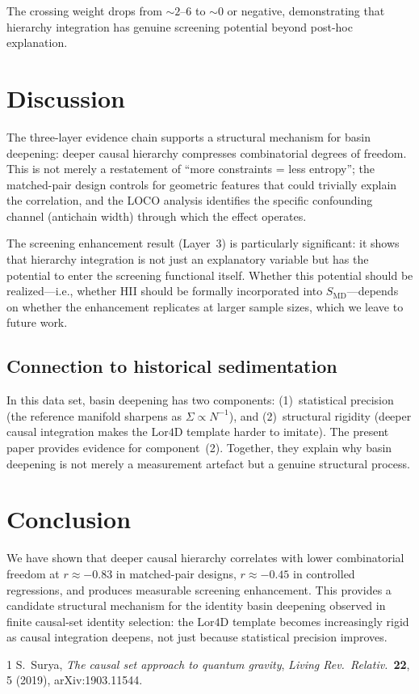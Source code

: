 \documentclass[12pt,a4paper]{article}
\newcommand{\Lor}{\mathrm{Lor4D}}
\begin{document}
The crossing weight drops from $\sim 2$--$6$ to $\sim 0$ or negative,
demonstrating that hierarchy integration has genuine screening potential beyond
post-hoc explanation.

\section{Discussion}

The three-layer evidence chain supports a structural mechanism for basin
deepening: deeper causal hierarchy compresses combinatorial degrees of freedom.
This is not merely a restatement of ``more constraints = less entropy''; the
matched-pair design controls for geometric features that could trivially explain
the correlation, and the LOCO analysis identifies the specific confounding
channel (antichain width) through which the effect operates.

The screening enhancement result (Layer~3) is particularly significant: it shows
that hierarchy integration is not just an explanatory variable but has the
potential to enter the screening functional itself.
Whether this potential should be realized---i.e., whether HII should be formally
incorporated into $S_{\mathrm{MD}}$---depends on whether the enhancement
replicates at larger sample sizes, which we leave to future work.

\subsection{Connection to historical sedimentation}

In this data set, basin deepening has two components:
(1)~statistical precision (the reference manifold sharpens as $\Sigma\propto
N^{-1}$), and
(2)~structural rigidity (deeper causal integration makes the $\Lor$ template
harder to imitate).
The present paper provides evidence for component~(2).
Together, they explain why basin deepening is not merely a measurement artefact
but a genuine structural process.

\section{Conclusion}

We have shown that deeper causal hierarchy correlates with lower combinatorial
freedom at $r\approx -0.83$ in matched-pair designs, $r\approx -0.45$ in
controlled regressions, and produces measurable screening enhancement.
This provides a candidate structural mechanism for the identity basin deepening
observed in finite causal-set identity selection: the $\Lor$ template becomes
increasingly rigid as causal integration deepens, not just because statistical
precision improves.

\begin{thebibliography}{1}
S.~Surya,
\emph{The causal set approach to quantum gravity},
\emph{Living Rev.\ Relativ.}\ \textbf{22}, 5 (2019),
arXiv:1903.11544.
\end{thebibliography}
\end{document}
